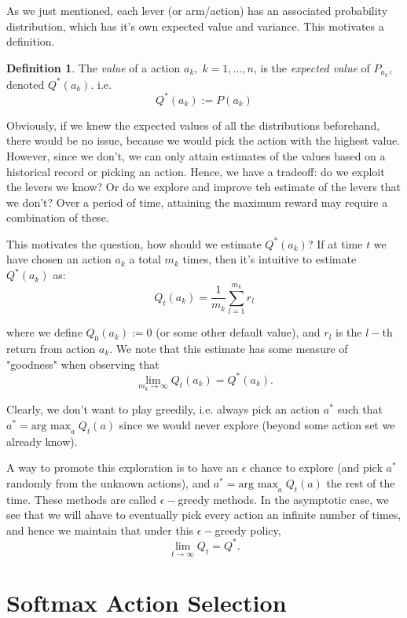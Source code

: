 \documentclass[11pt]{article}
\theoremstyle{definition}
\newtheorem{definition}{Definition}
\begin{document}
As we just mentioned, each lever (or arm/action) has an associated probability distribution, which has it's own expected value and variance.  This motivates a definition.

\begin{definition}
The \textit{value} of a action $a_k,\;k=1,\dots,n$, is the \textit{expected value} of $P_{a_k}$, denoted $Q^*(a_k)$.  i.e.
\[
    Q^*(a_k) := P(a_k)
\]
\end{definition}

Obviously, if we knew the expected values of all the distributions beforehand, there would be no issue, because we would pick the action with the highest value. However, since we don't, we can only attain estimates of the values based on a historical record or picking an action. Hence, we have a tradeoff: do we exploit the levers we know? Or do we explore and improve teh estimate of the levers that we don't? Over a period of time, attaining the maximum reward may require a combination of these.

This motivates the question, how should we estimate $Q^*(a_k)$?  If at time $t$ we have chosen an action $a_k$ a total $m_k$ times, then it's intuitive to estimate $Q^*(a_k)$ as:
\[
    Q_t(a_k) = \frac{1}{m_k} \sum_{l=1}^{m_k} r_l
\]

where we define $Q_0(a_k):=0$ (or some other default value), and $r_l$ is the $l-$th return from action $a_k$.  We note that this estimate has some measure of "goodness" when observing that
\[
    \lim_{m_k\to\infty} Q_t(a_k) = Q^*(a_k).
\]

Clearly, we don't want to play greedily, i.e. always pick an action $a^*$ such that $a^* = \text{arg max}_a\; Q_t(a)$ since we would never explore (beyond some action set we already know).

A way to promote this exploration is to have an $\epsilon$ chance to explore (and pick $a^*$ randomly from the unknown actions), and $a^* = \text{arg max}_a\; Q_t(a)$ the rest of the time.  These methods are called $\epsilon-$greedy methods.  In the asymptotic case, we see that we will ahave to eventually pick every action an infinite number of times, and hence we maintain that under this $\epsilon-$greedy policy,
\[
    \lim_{t\to\infty} Q_t = Q^*.
\]

\section*{\textcolor{CalPolyGreen}{Softmax Action Selection}}
\end{document}
